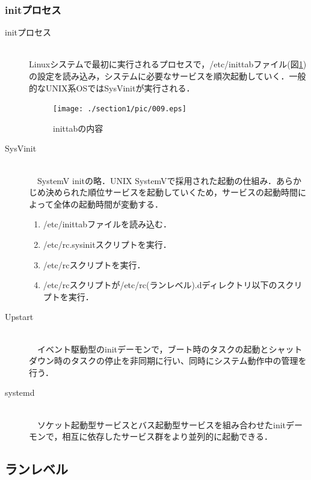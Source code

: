 \subsubsection{initプロセス}
\begin{description}
	\item[initプロセス]\mbox{}\\
	Linuxシステムで最初に実行されるプロセスで，/etc/inittabファイル(図\ref{009})の設定を読み込み，システムに必要なサービスを順次起動していく．一般的なUNIX系OSではSysVinitが実行される．
		\begin{figure}[!h]
			\begin{center}
				\texttt{[image: ./section1/pic/009.eps]}
				\caption{inittabの内容}
				\label{009}
			\end{center}
		\end{figure}
\end{description}
\begin{description}
	\item[SysVinit]\mbox{}\\
　SystemV initの略．UNIX SystemVで採用された起動の仕組み．あらかじめ決められた順位サービスを起動していくため，サービスの起動時間によって全体の起動時間が変動する．
		\begin{enumerate}
			\item /etc/inittabファイルを読み込む．
			\item /etc/rc.sysinitスクリプトを実行．
			\item /etc/rcスクリプトを実行．
			\item /etc/rcスクリプトが/etc/rc(ランレベル).dディレクトリ以下のスクリプトを実行．
		\end{enumerate}
	\item[Upstart]\mbox{}\\
　イベント駆動型のinitデーモンで，ブート時のタスクの起動とシャットダウン時のタスクの停止を非同期に行い、同時にシステム動作中の管理を行う．
	\item[systemd]\mbox{}\\
　ソケット起動型サービスとバス起動型サービスを組み合わせたinitデーモンで，相互に依存したサービス群をより並列的に起動できる．
\end{description}

\subsection{ランレベル}